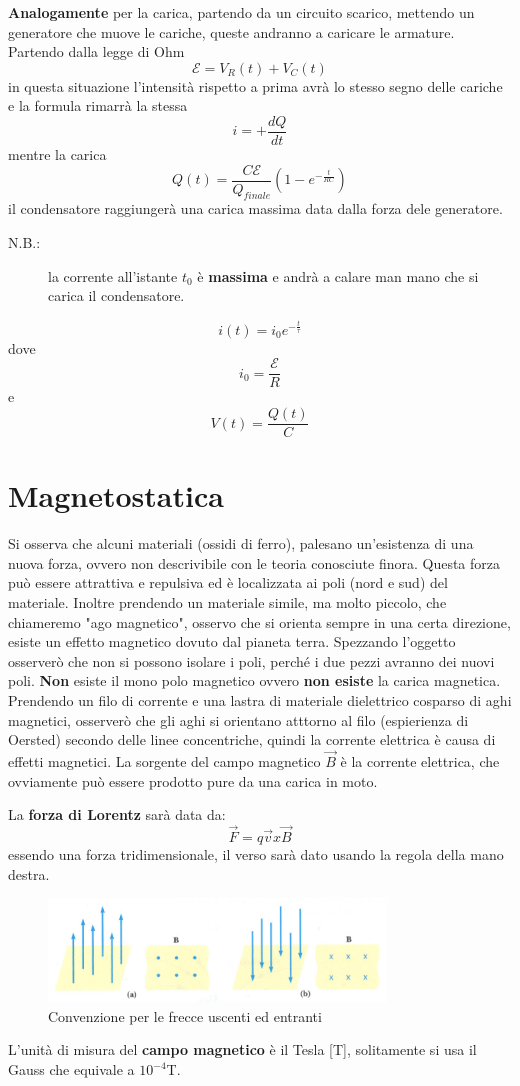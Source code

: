\documentclass[a4paper, 12pt]{book}
\theoremstyle{plain}
\begin{document}
\textbf{Analogamente} per la carica, partendo da un circuito 
scarico, mettendo un generatore che muove le cariche, queste 
andranno a caricare le armature. Partendo dalla legge di 
Ohm \[ \mathcal{E} = V_R(t) + V_C(t) \] in questa situazione 
l'intensità rispetto a prima avrà lo stesso segno delle cariche e 
la formula rimarrà la stessa \[ i = +\frac{dQ}{dt} \] 
mentre la carica \[ Q(t) = \frac{C \mathcal{E} }{Q_{finale}} (1 - e^{-\frac{t}{RC}}) \] il condensatore 
raggiungerà una carica massima data dalla forza dele generatore.
\begin{description}
    \item[N.B.:] la corrente all'istante $t_0$ è \textbf{massima} e andrà a calare man mano che si carica il condensatore.
\end{description}
\[i(t) = i_0 e^{-\frac{t}{\tau}} \] dove \[ i_0 = \frac{\mathcal{E}}{R} \] 
e \[ V(t) = \frac{Q(t)}{C} \] 

\chapter{Magnetostatica}

Si osserva che alcuni materiali (ossidi di ferro), palesano 
un'esistenza di una nuova forza, ovvero non descrivibile con le 
teoria conosciute finora. Questa forza può essere attrattiva e repulsiva
ed è localizzata ai poli (nord e sud) del materiale.
Inoltre prendendo un materiale simile, ma molto piccolo,
che chiameremo "ago magnetico", osservo che si orienta
sempre in una certa direzione, esiste un effetto magnetico
dovuto dal pianeta terra. Spezzando l'oggetto osserverò 
che non si possono isolare i poli, perché i due pezzi 
avranno dei nuovi poli. \textbf{Non} esiste il mono polo magnetico
ovvero \textbf{non esiste} la carica magnetica. Prendendo 
un filo di corrente e una lastra di materiale dielettrico cosparso di 
aghi magnetici, osserverò che gli aghi si orientano atttorno 
al filo (espierienza di Oersted) secondo delle linee concentriche, 
quindi la corrente elettrica è causa di effetti magnetici.
La sorgente del campo magnetico $\vec{B}$ è la corrente 
elettrica, che ovviamente può essere prodotto pure da una 
carica in moto.

La \textbf{forza di Lorentz} sarà data da: \[ \vec{F} = q \vec{v} x \vec{B} \] 
essendo una forza tridimensionale, il verso sarà dato 
usando la regola della mano destra.
\begin{figure}
    \includegraphics[width=0.8\textwidth]{frecce.png}
    \caption{Convenzione per le frecce uscenti ed entranti}
\end{figure}
L'unità di misura del \textbf{campo magnetico} è il Tesla [T], 
solitamente si usa il Gauss che equivale a $10^{-4}$T.
\end{document}
